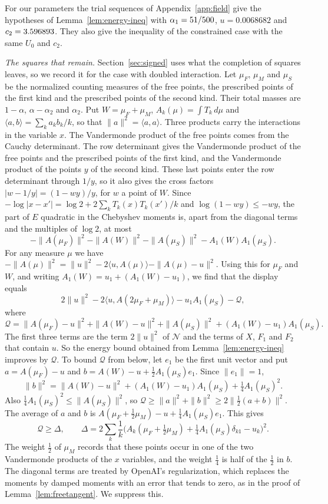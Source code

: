 For our parameters the trial sequences of Appendix~\ref{app:field} give the hypotheses of
Lemma~\ref{lem:energy-ineq} with $\alpha_1=51/500$, $u=0.0068682$ and $c_2=3.596893$. They also give the
inequality of the constrained case with the same $U_0$ and $c_2$.

\emph{The squares that remain.} Section~\ref{sec:signed} uses what the completion of squares leaves, so we record it for the case with doubled
interaction. Let $\mu_F$, $\mu_M$ and $\mu_S$ be the normalized counting measures of the free points, the prescribed points of the first kind and the
prescribed points of the second kind. Their total masses are $1-\alpha$, $\alpha-\alpha_2$ and $\alpha_2$. Put $W=\mu_F+\mu_M$,
$A_k(\mu)=\int T_k\,d\mu$ and $\langle a,b\rangle=\sum_ka_kb_k/k$, so that $\|a\|^2=\langle a,a\rangle$. Three products carry the interactions
in the variable $x$. The Vandermonde product of the free points comes from the Cauchy determinant. The row determinant gives the Vandermonde product of the
free points and the prescribed points of the first kind, and the Vandermonde product of the points $y$ of the second kind. These last points
enter the row determinant through $1/y$, so it also gives the cross factors $|w-1/y|=(1-wy)/y$, for $w$ a point of $W$.
Since $-\log|x-x'|=\log2+2\sum_kT_k(x)T_k(x')/k$ and $\log(1-wy)\le-wy$, the part of $E$ quadratic in the Chebyshev moments is, apart from the
diagonal terms and the multiples of $\log2$, at most
\[
 -\|A(\mu_F)\|^2-\|A(W)\|^2-\|A(\mu_S)\|^2-A_1(W)A_1(\mu_S).
\]
For any measure $\mu$ we have $-\|A(\mu)\|^2=\|u\|^2-2\langle u,A(\mu)\rangle-\|A(\mu)-u\|^2$. Using this for $\mu_F$ and $W$, and writing
$A_1(W)=u_1+(A_1(W)-u_1)$, we find that the display equals
\[
 2\|u\|^2-2\langle u,A(2\mu_F+\mu_M)\rangle-u_1A_1(\mu_S)-\mathcal Q,
\]
where
\[
 \mathcal Q=\|A(\mu_F)-u\|^2+\|A(W)-u\|^2+\|A(\mu_S)\|^2+(A_1(W)-u_1)A_1(\mu_S).
\]
The first three terms are the term $2\|u\|^2$ of $\mathcal N$ and the terms of $X$, $F_1$ and $F_2$ that contain $u$. So the energy bound obtained from
Lemma~\ref{lem:energy-ineq} improves by $\mathcal Q$. To bound $\mathcal Q$ from below, let $e_1$ be the first
unit vector and put $a=A(\mu_F)-u$ and $b=A(W)-u+\frac12A_1(\mu_S)e_1$. Since $\|e_1\|=1$,
\[
 \|b\|^2=\|A(W)-u\|^2+(A_1(W)-u_1)A_1(\mu_S)+\tfrac14A_1(\mu_S)^2 .
\]
Also $\frac14A_1(\mu_S)^2\le\|A(\mu_S)\|^2$, so $\mathcal Q\ge\|a\|^2+\|b\|^2\ge2\|\frac12(a+b)\|^2$. The average of $a$ and $b$ is
$A(\mu_F+\frac12\mu_M)-u+\frac14A_1(\mu_S)e_1$. This gives
\begin{equation}\label{eq:squares}
 \mathcal Q\ge\Delta,\qquad\Delta=2\sum_k\frac1k\bigl(A_k(\mu_F+\tfrac12\mu_M)+\tfrac14A_1(\mu_S)\delta_{k1}-u_k\bigr)^2 .
\end{equation}
The weight $\frac12$ of $\mu_M$ records that these points occur in one of the two Vandermonde products of the $x$ variables, and the weight
$\frac14$ is half of the $\frac12$ in $b$. The diagonal terms are treated by OpenAI's regularization, which replaces the moments by damped moments
with an error that tends to zero, as in the proof of Lemma~\ref{lem:freetangent}. We suppress this.

